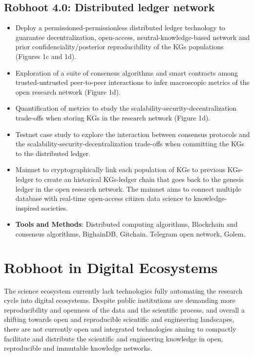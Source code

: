 \documentclass[10pt, a4paper, twocolumn]{article} %
\begin{document}
{  \subsection{Robhoot 4.0: Distributed ledger network}
  \begin{itemize}
  \item Deploy a permissioned-permissionless distributed ledger
    technology to guarantee decentralization, open-access,
    neutral-knowledge-based network and prior
    confidenciality/posterior reproducibility of the KGs populations
    (Figures 1c and 1d).
  \item Exploration of a suite of consensus algorithms and smart
    contracts among trusted-untrusted peer-to-peer interactions to
    infer macroscopic metrics of the open research network (Figure
    1d).
  \item Quantification of metrics to study the
    scalability-security-decentralization trade-offs when storing KGs
    in the research network (Figure 1d).
  \item Testnet case study to explore the interaction between
    consensus protocols and the scalability-security-decentralization
    trade-offs when committing the KGs to the distributed ledger.
  \item Mainnet to cryptographically link each population of KGs to
    previous KGs-ledger to create an historical KGs-ledger chain that
    goes back to the genesis ledger in the open research network. The
    mainnet aims to connect multiple database with real-time
    open-access citizen data science to knowledge-inspired societies.
  \end{itemize}

   \begin{itemize}
   \item {\bf Tools and Methods}: Distributed computing algorithms,
     Blockchain and consensus algorithms, BighainDB,
     Gitchain. Telegram open network, Golem.
 \end{itemize}
  
  \section{Robhoot in Digital Ecosystems}
  The science ecosystem currently lack technologies fully automating
  the research cycle into digital ecosystems. Despite public
  institutions are demanding more reproducibility and openness of the
  data and the scientific process, and overall a shifting towards open
  and reproducible scientific and engineering landscapes, there are
  not currently open and integrated technologies aiming to compactly
  facilitate and distribute the scientific and engineering knowledge
  in open, reproducible and immutable knowledge networks.
  
}
\end{document}
